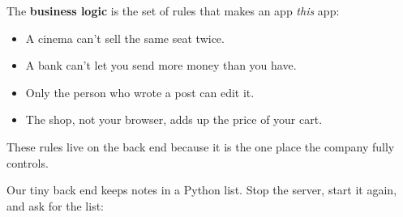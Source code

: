 \begin{codebox}[short]

\begin{Shaded}
\begin{Highlighting}[]
\end{Highlighting}
\end{Shaded}

\end{codebox}

\label{webapp-03:business-logic-the-house-rules}

The \textbf{business logic} is the set of rules that makes an app \emph{this} app:

\begin{itemize}
\tightlist
\item
  A cinema can't sell the same seat twice.
\item
  A bank can't let you send more money than you have.
\item
  Only the person who wrote a post can edit it.
\item
  The shop, not your browser, adds up the price of your cart.
\end{itemize}

\noindent{}These rules live on the back end because it is the one place the company fully controls.

\label{webapp-03:the-database-where-your-data-lives}

Our tiny back end keeps notes in a Python list. Stop the server, start it again, and ask for the list:

\begin{codebox}[short]

\begin{Shaded}
\begin{Highlighting}[]
\end{Highlighting}
\end{Shaded}

\end{codebox}

\begin{codebox}[short]

\begin{Shaded}
\begin{Highlighting}[]
\end{Highlighting}
\end{Shaded}

\end{codebox}

